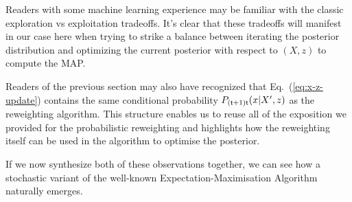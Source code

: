 Readers with some machine learning experience may be familiar with the classic exploration vs exploitation tradeoffs. It's clear that these tradeoffs will manifest in our case here when trying to strike a balance between iterating the posterior distribution and optimizing the current posterior with respect to $(X,z)$ to compute the MAP. 

Readers of the previous section may also have recognized that Eq.~(\ref{eq:x-z-update}) contains the same conditional probability $P_{({\sf t}+1){\sf t}}(x\vert X',z)$ as the reweighting algorithm. This structure enables us to reuse all of the exposition we provided for the probabilistic reweighting and highlights how the reweighting itself can be used in the algorithm to optimise the posterior.   

If we now synthesize both of these observations together, we can see how a stochastic variant of the well-known Expectation-Maximisation Algorithm~\cite{hartley1958maximum, dempster1977maximum, murphy2012machine} naturally emerges.


